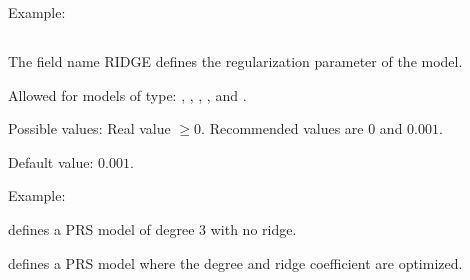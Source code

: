 \documentclass[letterpaper,10pt,english]{sphinxmanual}
\begin{document}
\begin{DUlineblock}{0em}
\item[] Example:
\item[] 
\item[] 
\item[] 
\end{DUlineblock}


\subsection{}
\label{\detokenize{SgteLib:ridge}}\label{\detokenize{SgteLib:id14}}
\begin{DUlineblock}{0em}
\item[] The field name RIDGE defines the regularization parameter of the model.
\item[] Allowed for models of type: {\hyperref[\detokenize{SgteLib:prs}]{}}, {\hyperref[\detokenize{SgteLib:prs-edge}]{}}, {\hyperref[\detokenize{SgteLib:prs-cat}]{}}, {\hyperref[\detokenize{SgteLib:rbf}]{}}, {\hyperref[\detokenize{SgteLib:kriging}]{}} and {\hyperref[\detokenize{SgteLib:lowess}]{}}.
\item[] Possible values: Real value \(\geq 0\). Recommended values are \(0\) and \(0.001\).
\item[] Default value: \(0.001\).
\end{DUlineblock}

\begin{DUlineblock}{0em}
\item[] Example:
\item[]  defines a PRS model of degree 3 with no ridge.
\item[]  defines a PRS model where the degree and ridge coefficient are optimized.
\end{DUlineblock}
\end{document}
